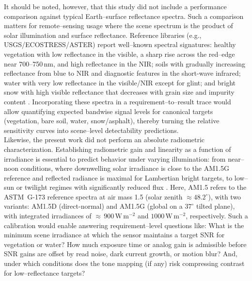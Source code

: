 \noindent
It should be noted, however, that this study did not include a performance comparison against typical Earth–surface reflectance spectra. Such a comparison matters for remote–sensing usage where the scene spectrum is the product of solar illumination and surface reflectance. Reference libraries (e.g., USGS/ECOSTRESS/ASTER) report well–known spectral signatures: healthy vegetation with low reflectance in the visible, a sharp rise across the red–edge near 700–750\,nm, and high reflectance in the NIR; soils with gradually increasing reflectance from blue to NIR and diagnostic features in the short-wave infrared; water with very low reflectance in the visible/NIR except for glint; and bright snow with high visible reflectance that decreases with grain size and impurity content \cite{USGS_SpecLib_v7,ASTER_Baldridge2009,Seager2005RedEdge,Knipling1970,USGS_Landsat_SR}. Incorporating these spectra in a requirement–to–result trace would allow quantifying expected bandwise signal levels for canonical targets (vegetation, bare soil, water, snow/asphalt), thereby turning the relative sensitivity curves into scene–level detectability predictions.\\

\noindent
Likewise, the present work did not perform an absolute radiometric characterization. Establishing radiometric gain and linearity as a function of irradiance is essential to predict behavior under varying illumination: from near–noon conditions, where downwelling solar irradiance is close to the AM1.5G reference and reflected radiance is maximal for Lambertian bright targets, to low–sun or twilight regimes with significantly reduced flux \cite{NREL_AM15,Myers2011_ASTMG173}. Here, AM1.5 refers to the ASTM~G-173 reference spectra at air mass 1.5 (solar zenith $\approx 48.2^{\circ}$), with two variants: AM1.5D (direct-normal) and AM1.5G (global on a $37^{\circ}$ tilted plane), with integrated irradiances of $\approx\,900\,\mathrm{W\,m^{-2}}$ and $1000\,\mathrm{W\,m^{-2}}$, respectively. Such a calibration would enable answering requirement–level questions like: What is the minimum scene irradiance at which the sensor maintains a target SNR for vegetation or water? How much exposure time or analog gain is admissible before SNR gains are offset by read noise, dark current growth, or motion blur? And, under which conditions does the tone mapping (if any) risk compressing contrast for low–reflectance targets?\\

